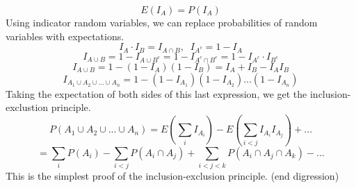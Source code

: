 $$E(I_A)=P(I_A)$$  
Using indicator random variables, we can replace probabilities of random variables with expectations.  
$$I_A\cdot I_B=I_{A\cap B},\;\;I_{A^c}=1-I_A$$
$$I_{A\cup B}=1-I_{{A\cup B}^c}=1-I_{A^c\cap B^c}=1-I_{A^c}\cdot I_{B^c}$$
$$I_{A\cup B}=1-(1-I_A)(1-I_B)=I_A+I_B-I_AI_B$$
$$I_{A_1\cup A_2\cup...\cup A_n}=1-(1-I_{A_1})(1-I_{A_2})...(1-I_{A_n})$$
Taking the expectation of both sides of this last expression, we get the inclusion-exclustion principle.
$$P(A_1\cup A_2\cup...\cup A_n)=E(\displaystyle\sum_i I_{A_i})-E(\displaystyle\sum_{i<j} I_{A_i}I_{A_j})+...$$
$$=\displaystyle\sum_i P(A_i)-\displaystyle\sum_{i<j}P(A_i\cap A_j)+\displaystyle\sum_{i<j<k}P(A_i\cap A_j\cap A_k)-...$$
This is the simplest proof of the inclusion-exclusion principle.  (end digression)
